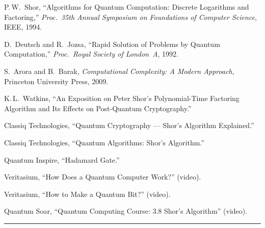 







\articlereferences

\begin{enumerate}[label={[\arabic*]}, leftmargin=2em, itemsep=0.25em]

\item P.\,W.~Shor, ``Algorithms for Quantum Computation: Discrete
      Logarithms and Factoring,'' \textit{Proc.\ 35th Annual Symposium
      on Foundations of Computer Science}, IEEE, 1994.

\item D.~Deutsch and R.~Jozsa, ``Rapid Solution of Problems by Quantum
      Computation,'' \textit{Proc.\ Royal Society of London~A}, 1992.

\item S.~Arora and B.~Barak, \textit{Computational Complexity: A Modern
      Approach}, Princeton University Press, 2009.

\item K.\,L.~Watkins, ``An Exposition on Peter Shor's Polynomial-Time
      Factoring Algorithm and Its Effects on Post-Quantum Cryptography.''

\item Classiq Technologies, ``Quantum Cryptography --- Shor's Algorithm
      Explained.''

\item Classiq Technologies, ``Quantum Algorithms: Shor's Algorithm.''






\item Quantum Inspire, ``Hadamard Gate.''

\item Veritasium, ``How Does a Quantum Computer Work?'' (video).

\item Veritasium, ``How to Make a Quantum Bit?'' (video).

\item Quantum Soar, ``Quantum Computing Course: 3.8 Shor's Algorithm''
      (video).

\end{enumerate}

\vspace{0.15cm}

\noindent\textcolor{cmjgold}{\rule{\textwidth}{1.2pt}}

\vspace{0.6cm}
